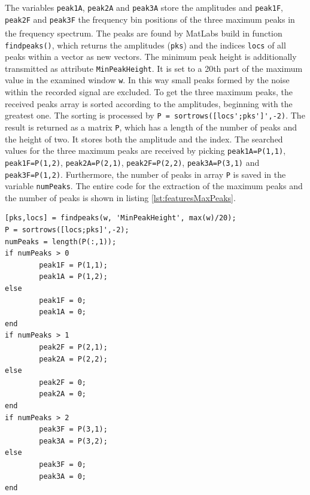 The variables \lstinline{peak1A}, \lstinline{peak2A} and \lstinline{peak3A} store the amplitudes and \lstinline{peak1F}, \lstinline{peak2F} and \lstinline{peak3F} the frequency bin positions of the three maximum peaks in the frequency spectrum. The peaks are found by MatLab\textsuperscript{\textregistered}s build in function \lstinline{findpeaks()}, which returns the amplitudes (\lstinline{pks}) and the indices \lstinline{locs} of all peaks within a vector as new vectors. The minimum peak height is additionally transmitted as attribute \lstinline{MinPeakHeight}. It is set to a 20th part of the maximum value in the examined window \lstinline{w}. In this way small peaks formed by the noise within the recorded signal are excluded. To get the three maximum peaks, the received peaks array is sorted according to the amplitudes, beginning with the greatest one. The sorting is processed by \lstinline{P = sortrows([locs';pks']',-2)}. The result is returned as a matrix \lstinline{P}, which has a length of the number of peaks and the height of two. It stores both the amplitude and the index. The searched values for the three maximum peaks are received by picking \lstinline{peak1A=P(1,1)}, \lstinline{peak1F=P(1,2)}, \lstinline{peak2A=P(2,1)}, \lstinline{peak2F=P(2,2)}, \lstinline{peak3A=P(3,1)} and \lstinline{peak3F=P(1,2)}. Furthermore, the number of peaks in array \lstinline{P} is saved in the variable \lstinline{numPeaks}. The entire code for the extraction of the maximum peaks and the number of peaks is shown in listing \ref{lst:featuresMaxPeaks}.

\newpage

\begin{lstlisting}[caption={Extraction of the three maximum peaks of a vector w},label={lst:featuresMaxPeaks}]
[pks,locs] = findpeaks(w, 'MinPeakHeight', max(w)/20); 
P = sortrows([locs;pks]',-2);
numPeaks = length(P(:,1));
if numPeaks > 0  
		peak1F = P(1,1);   
		peak1A = P(1,2);
else
		peak1F = 0;
		peak1A = 0;
end    
if numPeaks > 1 
		peak2F = P(2,1);
		peak2A = P(2,2);
else
		peak2F = 0;
		peak2A = 0;
end    
if numPeaks > 2 
		peak3F = P(3,1);
		peak3A = P(3,2);       
else
		peak3F = 0;
		peak3A = 0;
end  
\end{lstlisting}

